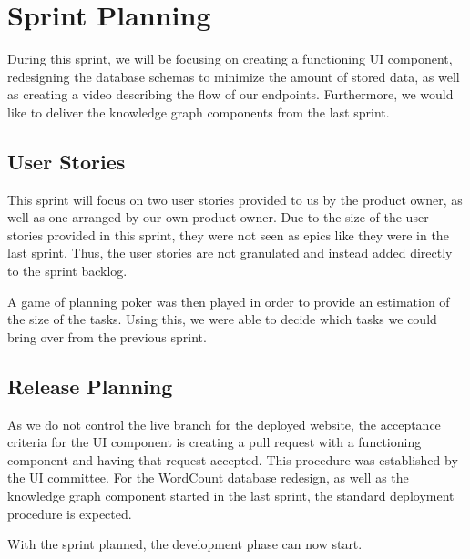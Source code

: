 \section{Sprint Planning}
During this sprint, we will be focusing on creating a functioning UI component, redesigning the database schemas to minimize the amount of stored data, as well as creating a video describing the flow of our endpoints. Furthermore, we would like to deliver the knowledge graph components from the last sprint. 

\subsection*{User Stories}
This sprint will focus on two user stories provided to us by the \knox{} product owner, as well as one arranged by our own product owner. 
Due to the size of the user stories provided in this sprint, they were not seen as epics like they were in the last sprint. Thus, the user stories are not granulated and instead added directly to the sprint backlog.  


A game of planning poker was then played in order to provide an estimation of the size of the tasks. 
Using this, we were able to decide which tasks we could bring over from the previous sprint.

\subsection*{Release Planning}
As we do not control the live branch for the deployed \knox{} website, the acceptance criteria for the UI component is creating a pull request with a functioning component and having that request accepted.
This procedure was established by the UI committee. 
For the WordCount database redesign, as well as the knowledge graph component started in the last sprint, the standard deployment procedure is expected. 

With the sprint planned, the development phase can now start.
